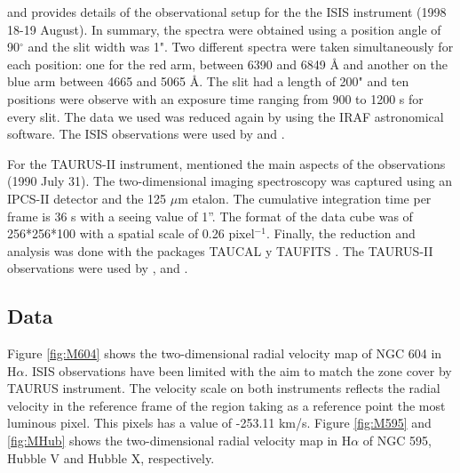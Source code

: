 \documentclass[fleqn,usenatbib]{mnras}
\begin{document}
\citet{2000PASP..112.1138M} and \citep{maiz2004} provides details of the observational setup for the the ISIS instrument (1998 18-19 August). In summary, the spectra were obtained  using a position angle of 90$^{\circ}$ and the slit width was 1". Two different spectra were taken simultaneously for each position: one for the red arm, between 6390 and 6849 \r{A} and another on the blue arm between 4665 and 5065 \r{A}. The slit had a length of 200" and ten  positions  were observe with an exposure time ranging from 900 to 1200 s for every slit. The  data we used was reduced again by \citet{jen2013} using the IRAF \citep{1999ascl.soft11002N} astronomical software. The ISIS observations were used by \citet{TT2000} and \citet{maiz2004}.  

For the TAURUS-II instrument, \cite{sabalisck1995supersonic} mentioned the main aspects of the observations (1990 July 31). The two-dimensional imaging spectroscopy was captured using an IPCS-II detector and the 125 $\mu$m etalon. The cumulative integration time per frame is 36 s with a seeing value of 1''. The format of the data cube was of 256*256*100 with a spatial scale of 0.26 pixel$^{-1}$. Finally, the reduction and analysis was done with the packages TAUCAL y TAUFITS \citep{1992ASPC...25..445L}.
The TAURUS-II observations were used by \cite{sabalisck1995supersonic}, \cite{tanco1997} and \cite{2019arXiv191203543M}.

\subsection{Data}

Figure \ref{fig:M604} shows the two-dimensional radial velocity map of NGC 604 in H$\alpha$. ISIS observations have been limited with the aim to match the zone cover by TAURUS instrument. The velocity scale on both instruments reflects the radial velocity in the reference frame of the region taking as a  reference point the most luminous pixel. This pixels has a value of -253.11 km/s. Figure \ref{fig:M595} and \ref{fig:MHub} shows the two-dimensional radial velocity map in H$\alpha$ of NGC 595, Hubble V and Hubble X, respectively.
\end{document}
